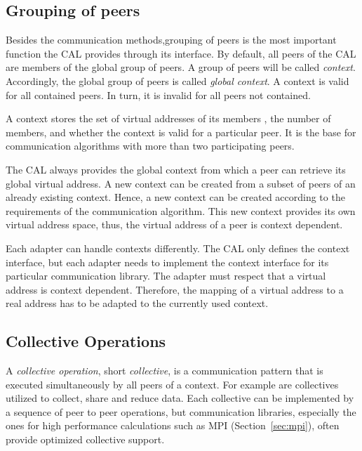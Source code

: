 \subsection{Grouping of peers}
\label{sec:cal_context}
Besides the communication methods,grouping of peers is the most
important function the CAL provides through its interface.  By
default, all peers of the CAL are members of the global group of peers.
A group of peers will be called \textit{context}. Accordingly, the
global group of peers is called \emph{global context}. A context is valid for
all contained peers. In turn, it is invalid for all peers not
contained.

A context stores the set of virtual addresses of its members , the
number of members, and whether the context is valid for a particular
peer. It is the base for communication algorithms with more than two
participating peers.

The CAL always provides the global context from which a peer can
retrieve its global virtual address. A new context can be created from
a subset of peers of an already existing context. Hence, a new context
can be created according to the requirements of the communication
algorithm. This new context provides its own virtual address space,
thus, the virtual address of a peer is context dependent.

Each adapter can handle contexts differently. The CAL only
defines the context interface, but each adapter needs to implement the
context interface for its particular communication
library. The adapter must respect that a virtual address
is context dependent. Therefore, the mapping of a virtual address to a
real address has to be adapted to the currently used context.

\subsection{Collective Operations}
\label{sec:cal_collective}
A \textit{collective operation}, short \textit{collective}, is a
communication pattern that is executed simultaneously by all peers of
a context. For example are collectives utilized to collect,
share and reduce data.  Each collective can be implemented by a
sequence of peer to peer operations, but communication libraries,
especially the ones for high performance calculations such as MPI
(Section~\ref{sec:mpi}), often provide optimized collective support.

